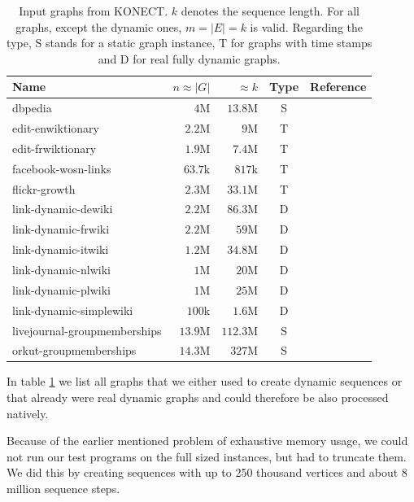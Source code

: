 \documentclass{article}      %
\begin{document}
\begin{table}
  	\centering
  	\small
  	\begin{tabular}{| l | r | r | c | c |}
    	\hline
    	Name & $n \approx |G|$ & $\approx k$ & Type & Reference \\
    	\hline
		dbpedia & $ 4$M & $ 13.8$M & S & \cite{konect:dbpedia} \\
    	edit-enwiktionary & $ 2.2$M & $ 9$M & T & \cite{konect:editen} \\
    	edit-frwiktionary & $ 1.9$M & $ 7.4$M & T & \cite{konect:editfr} \\
    	facebook-wosn-links & $ 63.7$k & $ 817$k & T & \cite{konect:facebook} \\
    	flickr-growth & $ 2.3$M & $ 33.1$M & T & \cite{konect:flickr} \\
    	link-dynamic-dewiki & $ 2.2$M & $ 86.3$M & D & \cite{konect:dewiki} \\
    	link-dynamic-frwiki & $ 2.2$M & $ 59$M & D & \cite{konect:frwiki} \\
    	link-dynamic-itwiki & $ 1.2$M & $ 34.8$M & D & \cite{konect:itwiki} \\
    	link-dynamic-nlwiki & $ 1$M & $ 20$M & D & \cite{konect:nlwiki} \\
    	link-dynamic-plwiki & $ 1$M & $ 25$M & D & \cite{konect:plwiki} \\
    	link-dynamic-simplewiki & $ 100$k & $ 1.6$M & D & \cite{konect:simplewiki} \\
    	livejournal-groupmemberships & $ 13.9$M & $ 112.3$M & S & \cite{konect:livejournal} \\
    	orkut-groupmemberships & $ 14.3$M & $ 327$M & S & \cite{konect:orkut} \\
    	\hline
    \end{tabular}
  	\caption{Input graphs from KONECT. $k$ denotes the sequence length. For all graphs, except the dynamic ones, $m=|E|=k$ is valid. Regarding the type, S stands for a static graph instance, T for graphs with time stamps and D for real fully dynamic graphs.}
  	\label{tab:graphs}
\end{table}

In table \ref{tab:graphs} we list all graphs that we either used to create dynamic sequences or that already were real dynamic graphs and could therefore be also processed natively.

Because of the earlier mentioned problem of exhaustive memory usage, we could not run our test programs on the full sized instances, but had to truncate them. We did this by creating sequences with up to 250 thousand vertices and about 8 million sequence steps.
\end{document}
